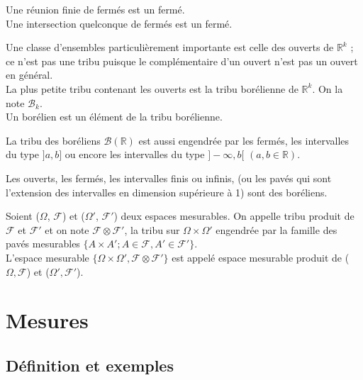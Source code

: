 \documentclass[landscape,twocolumn]{article}
\begin{document}
\begin{rappel}
Une réunion finie de fermés est un fermé. \\
Une intersection quelconque de fermés est un fermé.
\end{rappel}

\begin{defin}
Une classe d'ensembles particulièrement importante est celle des ouverts de $\mathbb{R}^k$ ; ce n'est pas une tribu puisque le complémentaire d'un ouvert n'est pas un ouvert en général. \\
La plus petite tribu contenant les ouverts est la tribu borélienne de $\mathbb{R}^k$. On la note $\mathcal{B}_k$. \\
Un borélien est un élément de la tribu borélienne. 
\end{defin}

\begin{astu}
La tribu des boréliens $\mathcal{B}(\mathbb{R})$ est aussi engendrée par les fermés, les intervalles du type $]a,b]$ ou encore les intervalles du type $]- \infty , b[$ $(a,b \in \mathbb{R})$.
\end{astu}

\begin{prop}[Boréliens]
Les ouverts, les fermés, les intervalles finis ou infinis, (ou les pavés qui sont l'extension des intervalles en dimension supérieure à 1) sont des boréliens.
\end{prop}

\begin{defin}
Soient ($\Omega$, $\mathcal{F}$) et ($\Omega '$, $\mathcal{F} '$) deux espaces mesurables. On appelle tribu produit de $\mathcal{F}$ et $\mathcal{F}'$ et on note $\mathcal{F} \otimes \mathcal{F}'$, la tribu sur $\Omega \times \Omega '$ engendrée par la famille des pavés mesurables $\{ A \times A' ; A \in \mathcal{F}, A' \in \mathcal{F}' \}$. \\
L'espace mesurable $\{ \Omega \times \Omega ', \mathcal{F} \otimes \mathcal{F}' \}$ est appelé espace mesurable produit de ($\Omega, \mathcal{F}$) et ($\Omega ', \mathcal{F} '$).
\end{defin}

\section{Mesures}

\subsection{Définition et exemples}
\end{document}
